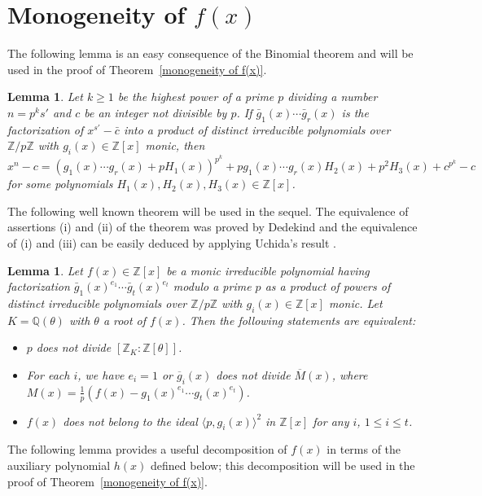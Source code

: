 \documentclass[table]{amsart}
\newtheorem{lemma}[theorem]{Lemma}
\newcommand{\Z}{\mathbb{Z}}
\newcommand{\Q}{\mathbb{Q}}
\numberwithin{equation}{section}
\begin{document}
\section{Monogeneity of \texorpdfstring{$f(x)$}{f(x)}}\label{sec:4}
The following lemma is an easy consequence of the Binomial theorem and will be used in the proof of Theorem~\ref{monogeneity of f(x)}.
\begin{lemma}\label{binomial expansion} { Let $k\geq 1$ be the highest power of a prime $p$ dividing a number $n=p^{k}s'$ and $c$ be an integer not divisible by $p$. If $\bar{g}_1(x)\cdots \bar{g}_r(x)$  is the factorization of $x^{s'}-\bar{c}$ into  a product of distinct irreducible polynomials over $\Z/p\Z$ with $g_i(x)\in\mathbb Z[x] $ monic, then 
		$$x^n-c=(g_1(x)\cdots g_r(x)+pH_1(x))^{p^k}+pg_1(x)\cdots g_r(x)H_2(x)+p^2H_3(x)+c^{p^k}-c$$ 
		\noindent for some polynomials  $H_1(x), H_2(x), H_3(x)\in \mathbb Z[x]$.}
\end{lemma}
The following well known theorem will be used in the sequel. The equivalence of
assertions (i) and (ii) of the theorem was proved by Dedekind \cite[Theorem 6.1.4]{CH1993} and the equivalence of (i) and (iii) can be easily deduced by applying Uchida’s result \cite{Uch77}. 
\begin{lemma}\label{dedekind}
	Let  $f(x) \in \Z[x]$ be a monic irreducible polynomial  having factorization $\bar{g}_1(x)^{e_1} \cdots \bar{g}_{t}(x)^{e_{t}}$ modulo a prime $p$ as a product of powers of distinct irreducible polynomials over $\Z/p\Z$ with $g_i(x) \in \Z[x]$ monic. Let $K=\Q(\theta)$ with $\theta$ a root of $f(x)$.   Then the following statements are equivalent:
	\begin{itemize}
		\item[\textup{(i)}] $p$ does not divide $[\Z_K:\Z[\theta]]$.
		\item[\textup{(ii)}] For each $i$, we have $e_i =1 $ or $\overline g_i (x)$ does not divide $\overline M(x)$, where $M(x) = \frac{1}{p}(f(x) -  g_1 (x)^{e_1} \cdots  g_{t} (x)^{e_{t}} )$.
		\item[\textup{(iii)}] $f(x)$ does not belong to the ideal $\langle p, g_i(x)\rangle^2$ in $\Z[x]$ for any $i$, $1\leq i\leq t$.
	\end{itemize}
\end{lemma} 
The following lemma provides a useful decomposition of $f(x)$ in terms of the auxiliary polynomial $h(x)$ defined below; this decomposition will be used in the proof of Theorem~\ref{monogeneity of f(x)}.
\end{document}
